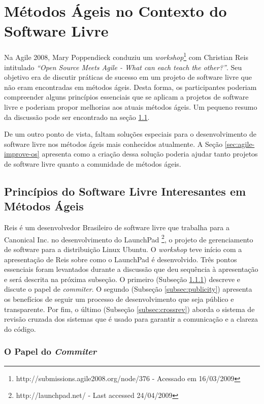 \chapter{Métodos Ágeis no Contexto do Software Livre}
\label{cap:agile}

Na Agile 2008, Mary Poppendieck conduziu um
\emph{workshop}\footnote{http://submissions.agile2008.org/node/376 -
  Acessado em 16/03/2009} com Christian Reis intitulado \emph{``Open
  Source Meets Agile - What can each teach the other?''}. Seu objetivo
era de discutir práticas de sucesso em um projeto de software livre
que não eram encontradas em métodos ágeis. Desta forma, os
participantes poderiam compreender alguns princípios essenciais que se
aplicam a projetos de software livre e poderiam propor melhorias aos
atuais métodos ágeis. Um pequeno resumo da discussão pode ser
encontrado na seção \ref{sec:foss-over-agile}.

De um outro ponto de vista, faltam soluções especiais para o
desenvolvimento de software livre nos métodos ágeis mais conhecidos
atualmente. A Seção \ref{sec:agile-improve-os} apresenta como a
criação dessa solução poderia ajudar tanto projetos de software livre
quanto a comunidade de métodos ágeis.

\section{Princípios do Software Livre Interesantes em Métodos Ágeis}
\label{sec:foss-over-agile}

Reis é um desenvolvedor Brasileiro de software livre que trabalha para
a Canonical Inc. no desenvolvimento do LaunchPad
\footnote{http://launchpad.net/ - Last accessed 24/04/2009}, o projeto
de gerenciamento de software para a distribuição Linux Ubuntu. O
\emph{workshop} teve início com a apresentação de Reis sobre como o
LaunchPad é desenvolvido. Três pontos essenciais foram levantados
durante a discussão que deu sequência à apresentação e será descrita
na próxima subseção. O primeiro (Subseção \ref{subsec:commiter})
descreve e discute o papel de \emph{commiter}.  O segundo (Subseção
\ref{subsec:publicity}) apresenta os benefícios de seguir um processo
de desenvolvimento que seja público e transparente.  Por fim, o último
(Subseção \ref{subsec:crossrev}) aborda o sistema de revisão cruzada
dos sistemas que é usado para garantir a comunicação e a clareza do
código.

\subsection{O Papel do \emph{Commiter}}
\label{subsec:commiter}

